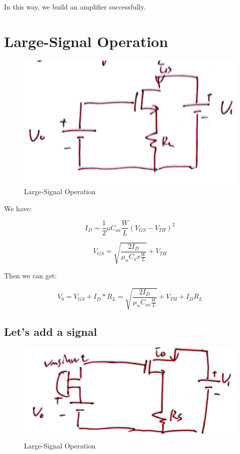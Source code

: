 \documentclass[fontset=windows]{article}
\begin{document}
In this way, we build an amplifier successfully. 

\section*{Large-Signal Operation}

\begin{figure}[htbp]
    \centering
    \includegraphics[scale=0.6]{4.jpg}
    \captionsetup{labelformat=empty}
    \caption{Large-Signal Operation}
    \label{4}
\end{figure}

We have: 

$$I_D=\frac{1}{2} \mu C_{ox}\frac{W}{L}(V_{GS}-V_{TH})^2$$

$$V_{GS}=\sqrt{\frac{2I_D}{\mu_nC_ox\frac{W}{L}}}+V_{TH}$$

Then we can get: 

$$V_0=V_{GS}+I_D*R_L=\sqrt{\frac{2I_D}{\mu_nC_{ox}\frac{W}{L}}}+V_{TH}+I_DR_L$$

\subsection*{Let's add a signal}

\begin{figure}[htbp]
    \centering
    \includegraphics[scale=0.6]{5.jpg}
    \captionsetup{labelformat=empty}
    \caption{Large-Signal Operation}
    \label{5}
\end{figure}
\end{document}
